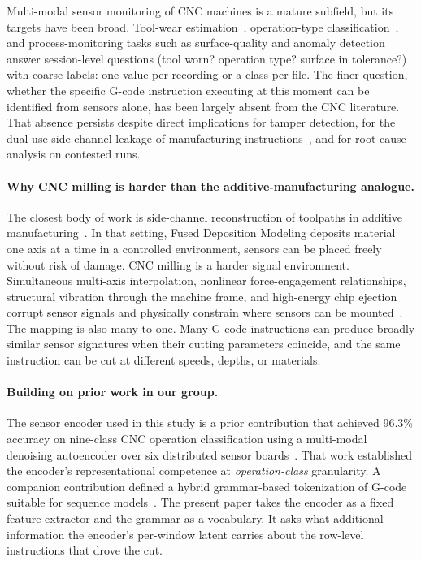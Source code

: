 \documentclass[sensors,article,submit,moreauthors,pdftex]{Definitions/mdpi}
\begin{document}
Multi-modal sensor monitoring of CNC machines is a mature subfield, but its targets have been broad. Tool-wear estimation~\cite{teti2010advanced,serin2020tool,zhu2009wavelet,mohanraj2020tool,wang2024multisensor}, operation-type classification~\cite{wang2018deep,zhao2019machine}, and process-monitoring tasks such as surface-quality and anomaly detection~\cite{stathatos2024cnn,coelho2024anomaly} answer session-level questions (tool worn? operation type? surface in tolerance?) with coarse labels: one value per recording or a class per file. The finer question, whether the specific G-code instruction executing at this moment can be identified from sensors alone, has been largely absent from the CNC literature. That absence persists despite direct implications for tamper detection, for the dual-use side-channel leakage of manufacturing instructions~\cite{alfaruque2016acoustic,song2016my,chhetri2016kcad,chhetri2017confidentiality,jamarani2024screg,chattopadhyay2025video}, and for root-cause analysis on contested runs.

\paragraph{Why CNC milling is harder than the additive-manufacturing analogue.} The closest body of work is side-channel reconstruction of toolpaths in additive manufacturing~\cite{alfaruque2016acoustic,song2016my,chhetri2016kcad}. In that setting, Fused Deposition Modeling deposits material one axis at a time in a controlled environment, sensors can be placed freely without risk of damage. CNC milling is a harder signal environment. Simultaneous multi-axis interpolation, nonlinear force-engagement relationships, structural vibration through the machine frame, and high-energy chip ejection corrupt sensor signals and physically constrain where sensors can be mounted~\cite{teti2010advanced,wang2018deep}. The mapping is also many-to-one. Many G-code instructions can produce broadly similar sensor signatures when their cutting parameters coincide, and the same instruction can be cut at different speeds, depths, or materials.

\paragraph{Building on prior work in our group.} The sensor encoder used in this study is a prior contribution that achieved 96.3\% accuracy on nine-class CNC operation classification using a multi-modal denoising autoencoder over six distributed sensor boards~\cite{encoder_paper}. That work established the encoder's representational competence at \emph{operation-class} granularity. A companion contribution defined a hybrid grammar-based tokenization of G-code suitable for sequence models~\cite{grammar_paper}. The present paper takes the encoder as a fixed feature extractor and the grammar as a vocabulary. It asks what additional information the encoder's per-window latent carries about the row-level instructions that drove the cut.
\end{document}
